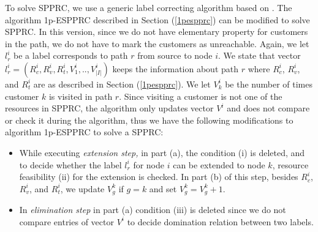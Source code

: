 To solve SPPRC, we use a generic label correcting algorithm based on 
\citet{Desrochers}. The algorithm 1p-ESPPRC described in Section  (\ref{1pespprc})
can be modified to solve SPPRC. In this version, since we do not have elementary
property for customers in the path, we do not have to mark the customers 
as unreachable. Again, we let $l_r^i$ be a label corresponds to 
path $r$ from source to node $i$. We state that vector 
$l_r^i = (R^i_c, R^i_{v},R^i_{t},  V^i_1,..,V^i_{|I|})$ keeps the information
about path $r$ where $R^i_c$, $R^i_{v}$, and $R^i_{t}$ are as described in
Section  (\ref{1pespprc}). We let $V^i_k$ be the number of times customer
$k$ is visited in path $r$. Since visiting a customer is not one of the
resources in SPPRC, the algorithm only updates vector $V^i$ and does not 
compare or check it during the algorithm, thus we have the following modifications 
to algorithm 1p-ESPPRC to solve a SPPRC:
\begin{itemize}
\item While executing {\em extension step,} in part (a), the condition (i)
is deleted, and to decide whether the label $l^i_r$ for node $i$ can be extended 
to node $k$, resource feasibility (ii) for the extension is checked. 
In part (b) of this step, besides $R^i_c$, $R^i_{v}$, and $R^i_{t}$, we update 
$V^k_g$ if $g = k$ and set $V^k_g = V^k_g +1$. 
\item In {\em elimination step} in part (a) condition (iii) is deleted
since we do not compare entries of vector $V^i$ to decide domination relation
between two labels.  
\end{itemize}



